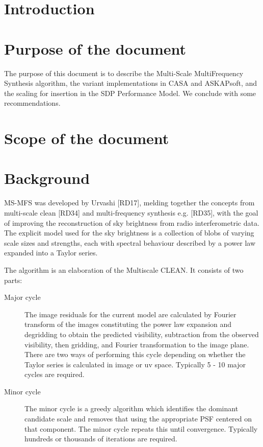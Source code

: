 \documentclass[11pt,a4paper]{article}
\begin{document}
\newpage
\section{Introduction}

\section{Purpose of the document}


The purpose of this document is to describe the Multi-Scale MultiFrequency Synthesis algorithm, the variant implementations in CASA and ASKAPsoft, and the scaling for insertion in the SDP Performance Model. We conclude with some recommendations.

\section{Scope of the document}

\section{Background}

MS-MFS was developed by Urvashi [RD17], melding together the concepts from multi-scale clean [RD34] and multi-frequency synthesis e.g. [RD35], with the goal of improving the reconstruction of sky brightness from radio interferometric data. The explicit model used for the sky brightness is a collection of blobs of varying scale sizes and strengths, each with spectral behaviour described by a power law expanded into a Taylor series.

The algorithm is an elaboration of the Multiscale CLEAN. It consists of two parts:
\begin{description}
\item[Major cycle] The image residuals for the current model are calculated by Fourier transform of the images constituting the power law expansion and degridding to obtain the predicted visibility, subtraction from the observed visibility, then gridding, and Fourier transformation to the image plane. There are two ways of performing this cycle depending on whether the Taylor series is calculated in image or uv space. Typically 5 - 10 major cycles are required.
\item[Minor cycle] The minor cycle is a greedy algorithm which identifies the dominant candidate scale and removes that using the appropriate PSF centered on that component. The minor cycle repeats this until convergence. Typically hundreds or thousands of iterations are required.
\end{description}
\end{document}
